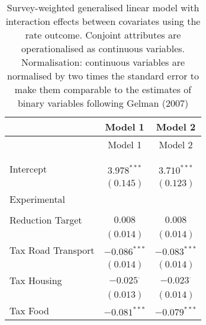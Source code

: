 
\usepackage{longtable}

\begin{center}
\begin{tiny}
\begin{longtable}{l@{} c@{} c@{}}
\hline
 & Model 1 & Model 2 \\
\hline
\endfirsthead
\hline
 & Model 1 & Model 2 \\
\hline
\endhead
\hline
\endfoot
\hline
\multicolumn{3}{l}{\tiny{$^{***}p<0.001$; $^{**}p<0.01$; $^{*}p<0.05$; $^{\cdot}p<0.1$}}\\
\caption{Survey-weighted generalised linear model with interaction effects between covariates using the rate outcome. Conjoint attributes are operationalised as continuous variables. Normalisation: continuous variables are normalised by two times
               the standard error to make them comparable to the estimates of binary variables following Gelman (2007)}
\label{table:weighted_interactions_exp_left_right_sal}
\endlastfoot \\
Intercept                                                                & $3.978^{***}$    & $3.710^{***}$    \\
                                                                         & $(0.145)$        & $(0.123)$        \\
Experimental                                                             &                  &                  \\
                                                                         &                  &                  \\
\quad Reduction Target                                                   & $0.008$          & $0.008$          \\
                                                                         & $(0.014)$        & $(0.014)$        \\
\quad Tax Road Transport                                                 & $-0.086^{***}$   & $-0.083^{***}$   \\
                                                                         & $(0.014)$        & $(0.014)$        \\
\quad Tax Housing                                                        & $-0.025^{\cdot}$ & $-0.023^{\cdot}$ \\
                                                                         & $(0.013)$        & $(0.014)$        \\
\quad Tax Food                                                           & $-0.081^{***}$   & $-0.079^{***}$   \\

\end{longtable}
\end{tiny}
\end{center}
